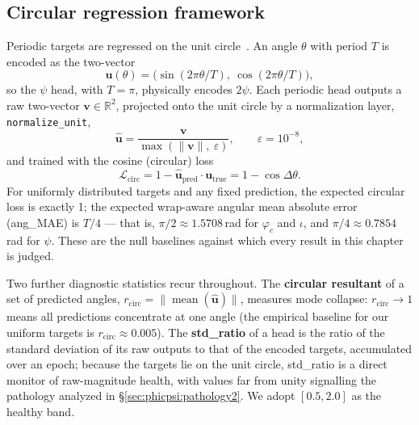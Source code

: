 \subsection{Circular regression framework}
\label{sec:phicpsi:circular}

Periodic targets are regressed on the unit circle~\cite{mardia2000circular}.
An angle $\theta$ with period $T$ is encoded as the two-vector
\begin{equation}
    \mathbf{u}(\theta) = \bigl(\sin(2\pi\theta/T),\ \cos(2\pi\theta/T)\bigr),
\end{equation}
so the $\psi$ head, with $T=\pi$, physically encodes $2\psi$.
Each periodic head outputs a raw two-vector $\mathbf{v} \in \mathbb{R}^2$, projected onto the unit circle by a normalization layer, \texttt{normalize\_unit},
\begin{equation}
    \hat{\mathbf{u}} = \frac{\mathbf{v}}{\max(\lVert\mathbf{v}\rVert,\ \varepsilon)},
    \qquad \varepsilon = 10^{-8},
\end{equation}
and trained with the cosine (circular) loss
\begin{equation}
    \mathcal{L}_{\mathrm{circ}}
    = 1 - \hat{\mathbf{u}}_{\mathrm{pred}} \cdot \mathbf{u}_{\mathrm{true}}
    = 1 - \cos\Delta\theta .
    \label{eq:circloss}
\end{equation}
For uniformly distributed targets and any fixed prediction, the expected circular loss is exactly 1; the expected wrap-aware angular mean absolute error (ang\_MAE) is $T/4$ --- that is, $\pi/2 \approx 1.5708$\,rad for $\varphi_c$ and $\iota$, and $\pi/4 \approx 0.7854$\,rad for $\psi$.
These are the null baselines against which every result in this chapter is judged.

Two further diagnostic statistics recur throughout.
The \textbf{circular resultant} of a set of predicted angles, $r_{\mathrm{circ}} = \lVert \operatorname{mean}(\hat{\mathbf{u}}) \rVert$, measures mode collapse: $r_{\mathrm{circ}} \to 1$ means all predictions concentrate at one angle (the empirical baseline for our uniform targets is $r_{\mathrm{circ}} \approx 0.005$).
The \textbf{std\_ratio} of a head is the ratio of the standard deviation of its raw outputs to that of the encoded targets, accumulated over an epoch; because the targets lie on the unit circle, std\_ratio is a direct monitor of raw-magnitude health, with values far from unity signalling the pathology analyzed in \S\ref{sec:phicpsi:pathology2}.
We adopt $[0.5, 2.0]$ as the healthy band.

